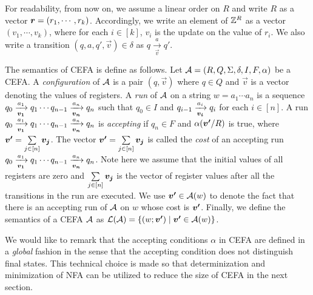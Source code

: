 For readability, from now on, we assume a linear order on $R$ and write $R$ as a vector $\myvec{r} = (r_1, \cdots, r_k)$. Accordingly, we write an element of $\mathbb{Z}^R$ as a vector $(v_1, \cdots, v_k)$, where for each $i \in [k]$, $v_i$ is the update on the value of $r_i$. We also write a transition $(q, a, q', \vec{v}) \in \delta$ as $q \xrightarrow[\vec{v}]{a} q'$.

The semantics of CEFA is define as follows. Let $\mathcal{A} = (R, Q, \Sigma, \delta, I, F, \alpha)$ be a CEFA. 
A \emph{configuration} of $\mathcal{A}$ is a pair $(q, \vec{v})$ where $q \in Q$ and $\vec{v}$ is a vector denoting the values of registers.  
A \emph{run} of $\mathcal{A}$ on a string $w = a_1 \cdots a_n$ is a sequence $q_0 \xrightarrow[\myvec{v_1}]{a_1} q_1 \cdots q_{n-1}\xrightarrow[\myvec{v_n}]{a_n} q_n$ such that $q_0 \in I$ and $q_{i-1} \xrightarrow[\myvec{v_i}]{a_i} q_i$ for each $i \in [n]$. A run $q_0 \xrightarrow[\myvec{v_1}]{a_1} q_1 \cdots q_{n-1}\xrightarrow[\myvec{v_n}]{a_n} q_n$ is \emph{accepting} if $q_n \in F$ and $\alpha(\myvec{v'}/R)$ is true, where $\myvec{v'} = \sum \limits_{j \in [n]} \myvec{v_j}$. The vector $\myvec{v'}= \sum \limits_{j \in [n]} \myvec{v_j}$ is called the \emph{cost} of an accepting run $q_0 \xrightarrow[\myvec{v_1}]{a_1} q_1 \cdots q_{n-1}\xrightarrow[\myvec{v_n}]{a_n} q_n$. Note here we assume that the initial values of all registers are zero and $\sum \limits_{j \in [n]} \myvec{v_j}$ is the vector of register values after all the transitions in the run are executed.  We use $\myvec{v'} \in \aut(w)$ to denote the fact that there is an accepting run of $\mathcal{A}$ on $w$ whose cost is $\myvec{v'}$. 
Finally, we define the semantics of a CEFA $\mathcal{A}$ as $\Lang(\aut) = \{(w; \myvec{v'}) \mid  \myvec{v'} \in \aut(w)\}$.  

We would like to remark that the accepting conditions $\alpha$ in CEFA are defined in a \emph{global} fashion in the sense that the accepting condition does not distinguish final states. This technical choice is made so that determinization and minimization of NFA can be utilized to reduce the size of CEFA in the next section. 

%

